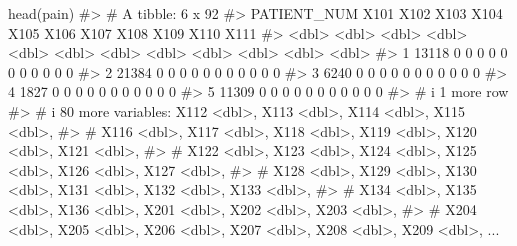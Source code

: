 \documentclass[
  letterpaper,
]{krantz}
\makeatletter
\newenvironment{Shaded}{\begin{snugshade}}{\end{snugshade}}
\newcommand{\CommentTok}[1]{\textcolor[rgb]{0.37,0.37,0.37}{#1}}
\newcommand{\FunctionTok}[1]{\textcolor[rgb]{0.28,0.35,0.67}{#1}}
\newcommand{\NormalTok}[1]{\textcolor[rgb]{0.00,0.23,0.31}{#1}}
\newenvironment{kframe}{%
\medskip{}
\setlength{\fboxsep}{.8em}
 \def\at@end@of@kframe{}%
 \ifinner\ifhmode%
  \def\at@end@of@kframe{\end{minipage}}%
  \begin{minipage}{\columnwidth}%
 \fi\fi%
 \def\FrameCommand##1{\hskip\@totalleftmargin \hskip-\fboxsep
 \colorbox{shadecolor}{##1}\hskip-\fboxsep
     \hskip-\linewidth \hskip-\@totalleftmargin \hskip\columnwidth}%
 \MakeFramed {\advance\hsize-\width
   \@totalleftmargin\z@ \linewidth\hsize
   \@setminipage}}%
 {\par\unskip\endMakeFramed%
 \at@end@of@kframe}
\renewenvironment{Shaded}{\begin{kframe}}{\end{kframe}}
\makeatother
\begin{document}
\begin{Shaded}
\begin{Highlighting}[]
\FunctionTok{head}\NormalTok{(pain)}
\CommentTok{\#\textgreater{} \# A tibble: 6 x 92}
\CommentTok{\#\textgreater{}   PATIENT\_NUM  X101  X102  X103  X104  X105  X106  X107  X108  X109  X110  X111}
\CommentTok{\#\textgreater{}         \textless{}dbl\textgreater{} \textless{}dbl\textgreater{} \textless{}dbl\textgreater{} \textless{}dbl\textgreater{} \textless{}dbl\textgreater{} \textless{}dbl\textgreater{} \textless{}dbl\textgreater{} \textless{}dbl\textgreater{} \textless{}dbl\textgreater{} \textless{}dbl\textgreater{} \textless{}dbl\textgreater{} \textless{}dbl\textgreater{}}
\CommentTok{\#\textgreater{} 1       13118     0     0     0     0     0     0     0     0     0     0     0}
\CommentTok{\#\textgreater{} 2       21384     0     0     0     0     0     0     0     0     0     0     0}
\CommentTok{\#\textgreater{} 3        6240     0     0     0     0     0     0     0     0     0     0     0}
\CommentTok{\#\textgreater{} 4        1827     0     0     0     0     0     0     0     0     0     0     0}
\CommentTok{\#\textgreater{} 5       11309     0     0     0     0     0     0     0     0     0     0     0}
\CommentTok{\#\textgreater{} \# i 1 more row}
\CommentTok{\#\textgreater{} \# i 80 more variables: X112 \textless{}dbl\textgreater{}, X113 \textless{}dbl\textgreater{}, X114 \textless{}dbl\textgreater{}, X115 \textless{}dbl\textgreater{},}
\CommentTok{\#\textgreater{} \#   X116 \textless{}dbl\textgreater{}, X117 \textless{}dbl\textgreater{}, X118 \textless{}dbl\textgreater{}, X119 \textless{}dbl\textgreater{}, X120 \textless{}dbl\textgreater{}, X121 \textless{}dbl\textgreater{},}
\CommentTok{\#\textgreater{} \#   X122 \textless{}dbl\textgreater{}, X123 \textless{}dbl\textgreater{}, X124 \textless{}dbl\textgreater{}, X125 \textless{}dbl\textgreater{}, X126 \textless{}dbl\textgreater{}, X127 \textless{}dbl\textgreater{},}
\CommentTok{\#\textgreater{} \#   X128 \textless{}dbl\textgreater{}, X129 \textless{}dbl\textgreater{}, X130 \textless{}dbl\textgreater{}, X131 \textless{}dbl\textgreater{}, X132 \textless{}dbl\textgreater{}, X133 \textless{}dbl\textgreater{},}
\CommentTok{\#\textgreater{} \#   X134 \textless{}dbl\textgreater{}, X135 \textless{}dbl\textgreater{}, X136 \textless{}dbl\textgreater{}, X201 \textless{}dbl\textgreater{}, X202 \textless{}dbl\textgreater{}, X203 \textless{}dbl\textgreater{},}
\CommentTok{\#\textgreater{} \#   X204 \textless{}dbl\textgreater{}, X205 \textless{}dbl\textgreater{}, X206 \textless{}dbl\textgreater{}, X207 \textless{}dbl\textgreater{}, X208 \textless{}dbl\textgreater{}, X209 \textless{}dbl\textgreater{}, ...}

\end{Highlighting}
\end{Shaded}
\end{document}
